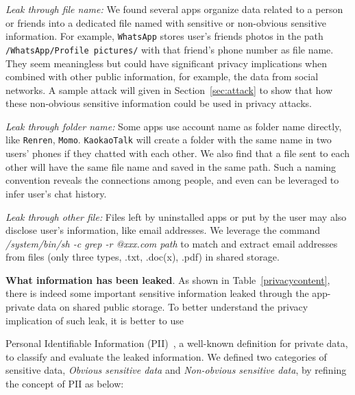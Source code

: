 \documentclass{sig-alternate}
\begin{document}
\vspace{2pt}\noindent \textit{Leak through file name:} We found several apps organize data related to a person or friends into a dedicated file named with sensitive or non-obvious sensitive information. For example, \texttt{WhatsApp} stores user's friends photos in the path \texttt{/WhatsApp/Profile pictures/} with that friend's phone number as file name. They seem meaningless but could have significant privacy implications when combined with other public information, for example, the data from social networks. A sample attack will given in Section~\ref{sec:attack} to show that how these non-obvious sensitive information could be used in privacy attacks.


\vspace{2pt}\noindent \textit{Leak through folder name:} Some apps use account name as folder name directly, like \texttt{Renren}, \texttt{Momo}. \texttt{KaokaoTalk} will create a folder with the same name in two users' phones if they chatted with each other. We also find that a file sent to each other will have the same file name and saved in the same path. Such a naming convention reveals the connections among people, and even can be leveraged to infer user's chat history.

\vspace{2pt}\noindent \textit{Leak through other file:} Files left by uninstalled apps or put by the user may also disclose user's information, like email addresses. We leverage the command \textit{/system/bin/sh -c grep -r @xxx.com path} to match and extract email addresses from files (only three types, .txt, .doc(x), .pdf) in shared storage.



\begin{figure}[tb]
\end{figure}




\vspace{8pt}
\noindent\textbf{What information has been leaked}. As shown in Table~\ref{privacycontent}, there is indeed some important sensitive information leaked through the app-private data on shared public storage. To better understand the privacy implication of such leak, it is better to use

Personal Identifiable Information (PII)~\cite{mccallister2010guide}, a well-known definition for private data, to classify and evaluate the leaked information. We defined two categories of sensitive data, \textit{Obvious sensitive data} and \textit{Non-obvious sensitive data}, by refining the concept of PII as below:
\end{document}
